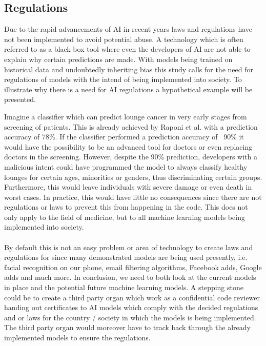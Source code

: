 \documentclass[12pt, fleqn, titlepage]{article}
\newcommand{\1}[1]{\mathds{1}\left[#1\right]}
\begin{document}
\subsection{Regulations}
Due to the rapid advancements of AI in recent years laws and regulations have not been implemented to avoid potential abuse. 
A technology which is often referred to as a black box tool where even the developers of AI are not able to explain why certain predictions are made. 
With models being trained on historical data and undoubtedly inheriting bias this study calls for the need for regulations of models with the intend of being implemented into society. 
To illustrate why there is a need for AI regulations a hypothetical example will be presented.

Imagine a classifier which can predict lounge cancer in very early stages from screening of patients. This is already achieved by Raponi et al. \cite{raponi} with a prediction accuracy of 78\%. If the classifier performed a prediction accuracy of ~90\% it would have the possibility to be an advanced tool for doctors or even replacing doctors in the screening. However, despite the 90\% prediction, developers with a malicious intent could have programmed the model to always classify healthy lounges for certain ages, minorities or genders, thus discriminating certain groups. Furthermore, this would leave individuals with severe damage or even death in worst cases. In practice, this would have little no consequences since there are not regulations or laws to prevent this from happening in the code. This does not only apply to the field of medicine, but to all machine learning models being implemented into society. 
\\\\
By default this is not an easy problem or area of technology to create laws and regulations for since many demonstrated models are being used presently, i.e. facial recognition on our phone, email filtering algorithms, Facebook adds, Google adds and much more. In conclusion, we need to both look at the current models in place and the potential future machine learning models. A stepping stone could be to create a third party organ which work as a confidential code reviewer handing out certificates to AI models which comply with the decided regulations and or laws for the country / society in which the models is being implemented. The third party organ would moreover have to track back through the already implemented models to ensure the regulations.
\end{document}
